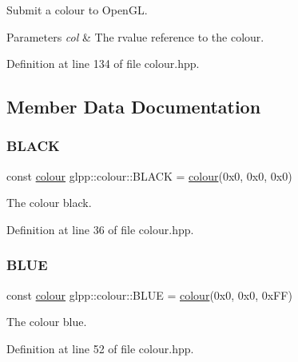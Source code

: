 Submit a colour to Open\+GL. 


\begin{DoxyParams}{Parameters}
{\em col} & The rvalue reference to the colour. \\
\hline
\end{DoxyParams}


Definition at line 134 of file colour.\+hpp.



\subsection{Member Data Documentation}
\mbox{\label{classglpp_1_1colour_a891850c908ec4f2cedcf5be236659fe9}} 
\subsubsection{\texorpdfstring{B\+L\+A\+CK}{BLACK}}
{\footnotesize\ttfamily const \hyperlink{classglpp_1_1colour}{colour} glpp\+::colour\+::\+B\+L\+A\+CK = \hyperlink{classglpp_1_1colour}{colour}(0x0, 0x0, 0x0)\hspace{0.3cm}{\ttfamily [static]}}

The colour black. 

Definition at line 36 of file colour.\+hpp.

\mbox{\label{classglpp_1_1colour_a3bf5061510f05ae45b9e48d8f22b6957}} 
\subsubsection{\texorpdfstring{B\+L\+UE}{BLUE}}
{\footnotesize\ttfamily const \hyperlink{classglpp_1_1colour}{colour} glpp\+::colour\+::\+B\+L\+UE = \hyperlink{classglpp_1_1colour}{colour}(0x0, 0x0, 0x\+F\+F)\hspace{0.3cm}{\ttfamily [static]}}

The colour blue. 

Definition at line 52 of file colour.\+hpp.

\mbox{\label{classglpp_1_1colour_afe1154e51ccabefeacab80a8fbdc6aaa}} 
